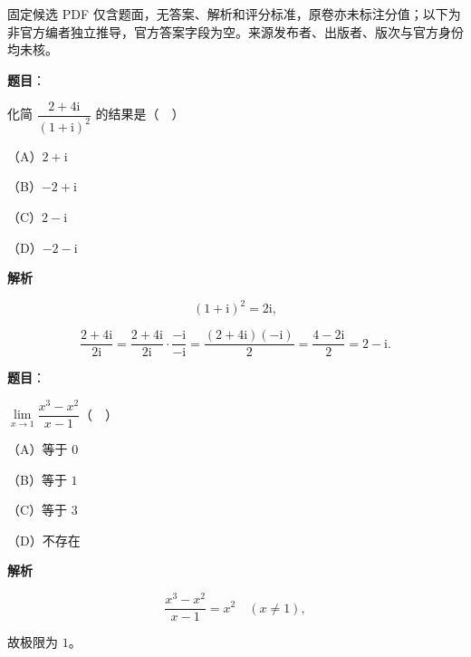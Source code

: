 

\begin{gktip}
固定候选 PDF 仅含题面，无答案、解析和评分标准，原卷亦未标注分值；以下为非官方编者独立推导，官方答案字段为空。来源发布者、出版者、版次与官方身份均未核。
\end{gktip}

\begin{answer}

\textbf{题目}：

化简 $\dfrac{2+4\mathrm i}{(1+\mathrm i)^2}$ 的结果是（　）

（A）$2+\mathrm i$

（B）$-2+\mathrm i$

（C）$2-\mathrm i$

（D）$-2-\mathrm i$

\textbf{解析}

\nopagebreak[4]
\[(1+\mathrm i)^2=2\mathrm i,\]

\nopagebreak[4]
\[\frac{2+4\mathrm i}{2\mathrm i}=\frac{2+4\mathrm i}{2\mathrm i}\cdot\frac{-\mathrm i}{-\mathrm i}=\frac{(2+4\mathrm i)(-\mathrm i)}{2}=\frac{4-2\mathrm i}{2}=2-\mathrm i.\]


\end{answer}
\begin{answer}

\textbf{题目}：

$\lim\limits_{x\to1}\dfrac{x^3-x^2}{x-1}$（　）

（A）等于 $0$

（B）等于 $1$

（C）等于 $3$

（D）不存在

\textbf{解析}

\nopagebreak[4]
\[\frac{x^3-x^2}{x-1}=x^2\quad(x\neq1),\]

故极限为 $1$。


\end{answer}
